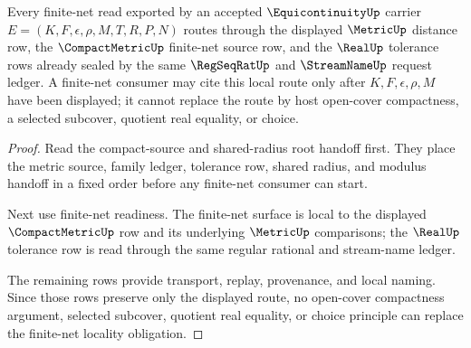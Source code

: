 \begin{theorem}
\label{thm:equicontinuity-root-obligation-finite-net}
Every finite-net read exported by an accepted $\EquicontinuityUp$ carrier
$E=(K,F,\epsilon,\rho,M,T,R,P,N)$ routes through the displayed
$\MetricUp$ distance row, the $\CompactMetricUp$ finite-net source row, and
the $\RealUp$ tolerance rows already sealed by the same $\RegSeqRatUp$ and
$\StreamNameUp$ request ledger. A finite-net consumer may cite this local
route only after $K,F,\epsilon,\rho,M$ have been displayed; it cannot replace
the route by host open-cover compactness, a selected subcover, quotient real
equality, or choice.
\end{theorem}
\begin{proof}
Read the compact-source and shared-radius root handoff first. They place the
metric source, family ledger, tolerance row, shared radius, and modulus
handoff in a fixed order before any finite-net consumer can start.

Next use finite-net readiness. The finite-net surface is local to the
displayed $\CompactMetricUp$ row and its underlying $\MetricUp$ comparisons;
the $\RealUp$ tolerance row is read through the same regular rational and
stream-name ledger.

The remaining rows provide transport, replay, provenance, and local naming.
Since those rows preserve only the displayed route, no open-cover compactness
argument, selected subcover, quotient real equality, or choice principle can
replace the finite-net locality obligation.
\end{proof}

